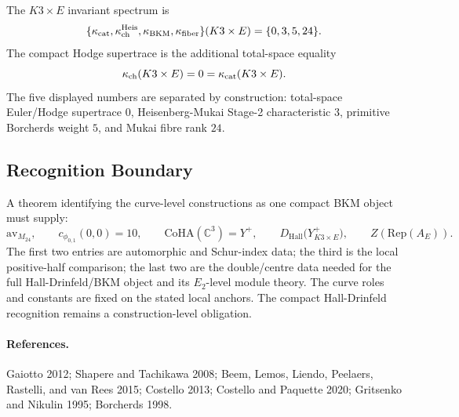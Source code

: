 The \(K3\times E\) invariant spectrum is
\[
  \{\kappa_{\mathrm{cat}},\kappa_{\mathrm{ch}}^{\mathrm{Heis}},\kappa_{\mathrm{BKM}},\kappa_{\mathrm{fiber}}\}(K3\times E)
  =
  \{0,3,5,24\}.
\]
The compact Hodge supertrace is the additional total-space equality
\[
  \kappa_{\mathrm{ch}}(K3\times E)=0=\kappa_{\mathrm{cat}}(K3\times E).
\]
The five displayed numbers are separated by construction: total-space
Euler/Hodge supertrace \(0\), Heisenberg-Mukai Stage-2 characteristic
\(3\), primitive Borcherds weight \(5\), and Mukai fibre rank \(24\).

\subsection*{Recognition Boundary}

A theorem identifying the curve-level constructions as one compact BKM
object must supply:
\[
  \mathrm{av}_{M_{24}},\qquad
  c_{\phi_{0,1}}(0,0)=10,\qquad
  \mathrm{CoHA}(\mathbb C^3)=Y^+,\qquad
  D_{\mathrm{Hall}}\bigl(Y^+_{K3\times E}\bigr),\qquad
  Z(\mathrm{Rep}(A_E)).
\]
The first two entries are automorphic and Schur-index data; the third is
the local positive-half comparison; the last two are the double/centre
data needed for the full Hall-Drinfeld/BKM object and its \(E_2\)-level
module theory. The curve roles and constants are fixed on the stated
local anchors. The compact Hall-Drinfeld recognition remains a
construction-level obligation.

\paragraph*{References.}
Gaiotto 2012; Shapere and Tachikawa 2008; Beem, Lemos, Liendo,
Peelaers, Rastelli, and van Rees 2015; Costello 2013; Costello and
Paquette 2020; Gritsenko and Nikulin 1995; Borcherds 1998.
